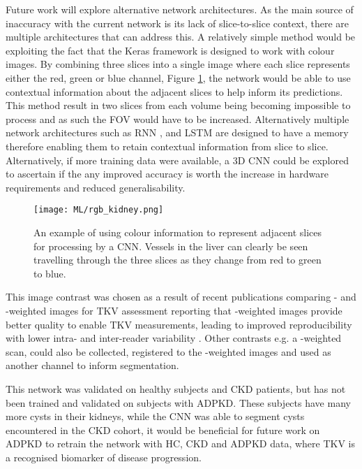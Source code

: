 Future work will explore alternative network architectures. As the main source of inaccuracy with the current network is its lack of slice-to-slice context, there are multiple architectures that can address this. A relatively simple method would be exploiting the fact that the Keras framework is designed to work with colour images. By combining three slices into a single image where each slice represents either the red, green or blue channel, Figure \ref{fig:ml_rgb_slices}, the network would be able to use contextual information about the adjacent slices to help inform its predictions. This method result in two slices from each volume being becoming impossible to process and as such the \ac{FOV} would have to be increased. Alternatively multiple network architectures such as \ac{RNN} \cite{chen_combining_2016}, and \ac{LSTM} \cite{stollenga_parallel_2015} are designed to have a memory therefore enabling them to retain contextual information from slice to slice. Alternatively, if more training data were available, a 3D \ac{CNN} could be explored to ascertain if the any improved accuracy is worth the increase in hardware requirements and reduced generalisability.
 
\begin{figure}[H]
	\centering
	\texttt{[image: ML/rgb\_kidney.png]}
	\caption{An example of using colour information to represent adjacent slices for processing by a \ac{CNN}. Vessels in the liver can clearly be seen travelling through the three slices as they change from red to green to blue.}
	\label{fig:ml_rgb_slices}	
\end{figure}

This image contrast was chosen as a result of recent publications comparing \tone- and \ttwo-weighted images for \ac{TKV} assessment reporting that \ttwo-weighted images provide better quality to enable \ac{TKV} measurements, leading to improved reproducibility with lower intra- and inter-reader variability \cite{van_gastel_t1_2018}. Other contrasts e.g. a \tone-weighted scan, could also be collected, registered to the \ttwo-weighted images and used as another channel to inform segmentation.

This network was validated on healthy subjects and \ac{CKD} patients, but has not been trained and validated on subjects with \ac{ADPKD}. These subjects have many more cysts in their kidneys, while the \ac{CNN} was able to segment cysts encountered in the \ac{CKD} cohort, it would be beneficial for future work on \ac{ADPKD} to retrain the network with \ac{HC}, \ac{CKD} and \ac{ADPKD} data, where \ac{TKV} is a recognised biomarker of disease progression.

